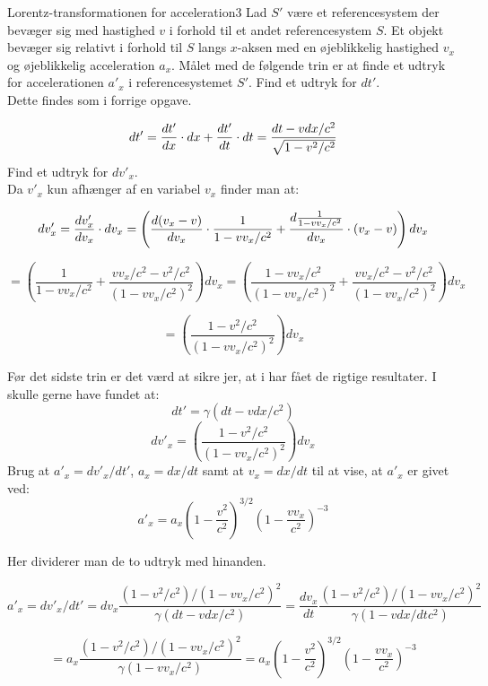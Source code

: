 \begin{opgave}{Lorentz-transformationen for acceleration}{3}
	Lad $S'$ være et referencesystem der bevæger sig med hastighed $v$ i forhold til et andet referencesystem $S$. Et objekt bevæger sig relativt i forhold til $S$ langs $x$-aksen med en øjeblikkelig hastighed $v_x$ og øjeblikkelig acceleration $a_x$. Målet med de følgende trin er at finde et udtryk for accelerationen $a'_x$ i referencesystemet $S'$.
	\opg Find et udtryk for $dt'$.\\
	
	Dette findes som i forrige opgave.
	
	$$dt' = {d{t'} \over d{x}} \cdot dx + {d{t'} \over d{t}} \cdot dt = \frac{dt - v dx/c^2}{\sqrt{1- v^2 / c^2}}  $$
	\opg Find et udtryk for $dv'_x$.\\
	
	Da $v'_x$ kun afhænger af en variabel $v_x$ finder man at:
	
	$$dv'_x = {d{v'_x} \over d{v_x}} \cdot dv_x = \left( {d{\left( v_x - v \right)} \over d{v_x}}  \cdot \frac{1}{1-vv_x/c^2} + {d{\frac{1}{1-vv_x/c^2}} \over d{v_x}} \cdot (v_x-v) \right) dv_x  $$
	
	$$=  \left( \frac{1}{1-vv_x/c^2} + \frac{vv_x/c^2 - v^2/c^2}{\left( 1-vv_x/c^2 \right)^2} \right) dv_x = \left( \frac{1-vv_x/c^2}{\left( 1-vv_x/c^2 \right)^2} + \frac{vv_x/c^2 - v^2/c^2}{\left( 1-vv_x/c^2 \right)^2} \right) dv_x $$
	
	$$= \left( \frac{1-v^2/c^2}{\left( 1 - vv_x/c^2 \right)^2} \right) dv_x$$
	
	Før det sidste trin er det værd at sikre jer, at i har fået de rigtige resultater. I skulle gerne have fundet at:
	$$dt' = \gamma \left( dt - v dx / c^2 \right)$$
	$$dv'_x = \left( \frac{1 - v^2/c^2}{ \left( 1-vv_x/c^2 \right)^2 } \right) dv_x$$
	\opg Brug at $a'_x = dv'_x / dt'$, $a_x = dx/dt$ samt at $v_x = dx/dt$ til at vise, at $a'_x$ er givet ved:
	$$a'_x = a_x \left( 1- \frac{v^2}{c^2} \right)^{3/2}  \left( 1 - \frac{vv_x}{c^2}  \right)^{-3}$$
	
	Her dividerer man de to udtryk med hinanden.
	
	$$ a'_x = dv'_x/dt' = dv_x \frac{ (1 - v^2/c^2)/ \left( 1-vv_x/c^2 \right)^2}{\gamma \left( dt - v dx / c^2 \right)} = \frac{dv_x}{dt} \frac{ (1 - v^2/c^2)/ \left( 1-vv_x/c^2 \right)^2}{\gamma \left( 1 - v dx /dt c^2 \right)} $$
	
	$$ = a_x \frac{ (1 - v^2/c^2)/ \left( 1-vv_x/c^2 \right)^2}{\gamma \left( 1 - v v_x/ c^2 \right)} = a_x \left( 1- \frac{v^2}{c^2} \right)^{3/2} \left( 1 - \frac{vv_x}{c^2}  \right)^{-3}  $$
\end{opgave}

